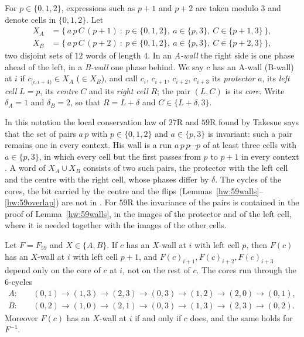 For $p\in\{0,1,2\}$, expressions such as $p+1$ and $p+2$ are taken modulo $3$ and denote cells in $\{0,1,2\}$. Let
\begin{align*}
X_A&=\{\,a\,p\,C\,(p+1)\ :\ p\in\{0,1,2\},\ a\in\{p,3\},\ C\in\{p+1,3\}\,\},\\
X_B&=\{\,a\,p\,C\,(p+2)\ :\ p\in\{0,1,2\},\ a\in\{p,3\},\ C\in\{p+2,3\}\,\},
\end{align*}
two disjoint sets of $12$ words of length $4$. In an \emph{A-wall} the right side is one phase ahead of the left, in a \emph{B-wall} one phase behind. We say $c$ has an A-wall (B-wall) at $i$ if $c_{[i,i+4)}\in X_A$ ($\in X_B$), and call $c_i$, $c_{i+1}$, $c_{i+2}$, $c_{i+3}$ its \emph{protector} $a$, its \emph{left cell} $L=p$, its \emph{centre} $C$ and its \emph{right cell} $R$; the pair $(L,C)$ is its \emph{core}. Write $\delta_A=1$ and $\delta_B=2$, so that $R=L+\delta$ and $C\in\{L+\delta,3\}$.

In this notation the local conservation law of $27$R and $59$R found by Takesue \cite[(4.1), (4.2)]{Takesue1989} says that the set of pairs $a\,p$ with $p\in\{0,1,2\}$ and $a\in\{p,3\}$ is invariant: such a pair remains one in every context. His wall is a run $a\,p\,p\cdots p$ of at least three cells with $a\in\{p,3\}$, in which every cell but the first passes from $p$ to $p+1$ in every context \cite[(4.3)]{Takesue1989}. A word of $X_A\cup X_B$ consists of two such pairs, the protector with the left cell and the centre with the right cell, whose phases differ by $\delta$. The cycles of the cores, the bit carried by the centre and the flips (Lemmas~\ref{hw:59walls}--\ref{hw:59overlap}) are not in \cite{Takesue1989}. For $59$R the invariance of the pairs is contained in the proof of Lemma~\ref{hw:59walls}, in the images of the protector and of the left cell, where it is needed together with the images of the other cells.

\begin{lemma}\label{hw:59walls}
Let $F=F_{59}$ and $X\in\{A,B\}$. If $c$ has an $X$-wall at $i$ with left cell $p$, then $F(c)$ has an $X$-wall at $i$ with left cell $p+1$, and $F(c)_{i+1},F(c)_{i+2},F(c)_{i+3}$ depend only on the core of $c$ at $i$, not on the rest of $c$. The cores run through the $6$-cycles
\begin{align*}
A:&\quad(0,1)\to(1,3)\to(2,3)\to(0,3)\to(1,2)\to(2,0)\to(0,1),\\
B:&\quad(0,2)\to(1,0)\to(2,1)\to(0,3)\to(1,3)\to(2,3)\to(0,2).
\end{align*}
Moreover $F(c)$ has an $X$-wall at $i$ if and only if $c$ does, and the same holds for $F^{-1}$.
\end{lemma}

